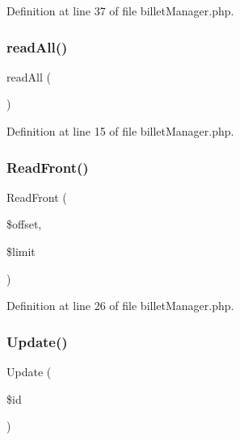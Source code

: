 Definition at line 37 of file billet\+Manager.\+php.

\mbox{\label{class_src_1_1_managers_1_1billet_manager_a13805b8509481a55ad18465816e97d39}} 
\subsubsection{read\+All()}
{\footnotesize\ttfamily read\+All (\begin{DoxyParamCaption}{ }\end{DoxyParamCaption})}



Definition at line 15 of file billet\+Manager.\+php.

\mbox{\label{class_src_1_1_managers_1_1billet_manager_af7e26a4a8ffd767a1265151f87860ddb}} 
\subsubsection{Read\+Front()}
{\footnotesize\ttfamily Read\+Front (\begin{DoxyParamCaption}\item[{}]{\$offset,  }\item[{}]{\$limit }\end{DoxyParamCaption})}



Definition at line 26 of file billet\+Manager.\+php.

\mbox{\label{class_src_1_1_managers_1_1billet_manager_a82232b33fbfacdbdb8a8f49acaecf564}} 
\subsubsection{Update()}
{\footnotesize\ttfamily Update (\begin{DoxyParamCaption}\item[{}]{\$id }\end{DoxyParamCaption})}



